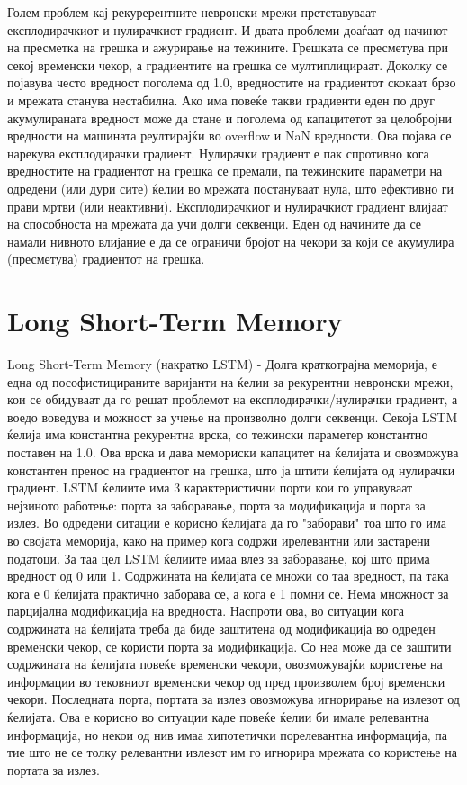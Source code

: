Голем проблем кај рекурерентните невронски мрежи претставуваат експлодирачкиот и нулирачкиот градиент. И двата проблеми доаѓаат од начинот на пресметка на грешка и ажурирање на тежините. Грешката се пресметува при секој временски чекор, а градиентите на грешка се мултиплицираат. Доколку се појавува често вредност поголема од 1.0, вредностите на градиентот скокаат брзо и мрежата станува нестабилна. Ако има повеќе такви градиенти еден по друг акумулираната вредност може да стане и поголема од капацитетот за целобројни вредности на машината реултирајќи во overflow и NaN вредности. Ова појава се нарекува експлодирачки градиент. Нулирачки градиент е пак спротивно кога вредностите на градиентот на грешка се премали, па тежинските параметри на одредени (или дури сите) ќелии во мрежата постануваат нула, што ефективно ги прави мртви (или неактивни). Експлодирачкиот и нулирачкиот градиент влијаат на способноста на мрежата да учи долги секвенци. Еден од начините да се намали нивното влијание е да се ограничи бројот на чекори за који се акумулира (пресметува) градиентот на грешка.

\section{Long Short-Term Memory}

Long Short-Term Memory (накратко LSTM) - Долга краткотрајна меморија, е една од пософистицираните варијанти на ќелии за рекурентни невронски мрежи, кои се обидуваат да го решат проблемот на експлодирачки/нулирачки градиент, а воедо воведува и можност за учење на произволно долги секвенци. Секоја LSTM ќелија има константна рекурентна врска, со тежински параметер константно поставен на 1.0. Ова врска и дава мемориски капацитет на ќелијата и овозможува константен пренос на градиентот на грешка, што ја штити ќелијата од нулирачки градиент. 
LSTM ќелиите има 3 карактеристични порти кои го управуваат нејзиното работење: порта за заборавање, порта за модификација и порта за излез. Во одредени ситации е корисно ќелијата да го "заборави" тоа што го има во својата меморија, како на пример кога содржи ирелевантни или застарени податоци. За таа цел LSTM ќелиите имаа влез за заборавање, кој што прима вредност од 0 или 1. Содржината на ќелијата се множи со таа вредност, па така кога е 0 ќелијата практично заборава се, а кога е 1 помни се. Нема множност за парцијална модификација на вредноста. Наспроти ова, во ситуации кога содржината на ќелијата треба да биде заштитена од модификација во одреден временски чекор, се користи порта за модификација. Со неа може да се заштити содржината на ќелијата повеќе временски чекори, овозможувајќи користење на информации во тековниот временски чекор од пред произволем број временски чекори. Последната порта, портата за излез овозможува игнорирање на излезот од ќелијата. Ова е корисно во ситуации каде повеќе ќелии би имале релевантна информација, но некои од нив имаа хипотетички порелевантна информација, па тие што не се толку релевантни излезот им го игнорира мрежата со користење на портата за излез.

